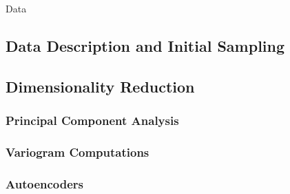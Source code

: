 Data

\subsection{Data Description and Initial Sampling}
\label{sec:datadescription}


\subsection{Dimensionality Reduction}
\label{sec:dimred}

\subsubsection{Principal Component Analysis}

\subsubsection{Variogram Computations}

\subsubsection{Autoencoders}


